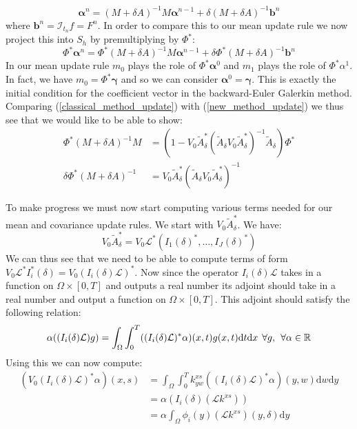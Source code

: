 \documentclass{article}
\theoremstyle{definition}
\theoremstyle{remark}
\theoremstyle{remark}
\begin{document}
\begin{equation}
    \boldsymbol{\alpha}^{n}=(M+\delta A)^{-1}M\boldsymbol{\alpha}^{n-1}+\delta(M+\delta A)^{-1}\mathbf{b}^{n}
\end{equation}
where $\mathbf{b}^{n}=\mathcal{I}_{t_n}f=F^{n}$. In order to compare this to our mean update rule we now project this into $S_{h}$ by premultiplying by $\Phi^{*}$:
\begin{equation}
    \label{classical_method_update}
    \Phi^{*}\boldsymbol{\alpha}^{n}=\Phi^{*}(M+\delta A)^{-1}M\boldsymbol{\alpha}^{n-1}+\delta\Phi^{*}(M+\delta A)^{-1}\mathbf{b}^{n}
\end{equation}
In our mean update rule $m_{0}$ plays the role of $\Phi^{*}\boldsymbol{\alpha}^{0}$ and $m_{1}$ plays the role of $\Phi^{*}\alpha^{1}$. In fact, we have $m_{0}=\Phi^{*}\boldsymbol{\gamma}$ and so we can consider $\boldsymbol{\alpha}^{0}=\boldsymbol{\gamma}$. This is exactly the initial condition for the coefficient vector in the backward-Euler Galerkin method. Comparing (\ref{classical_method_update}) with (\ref{new_method_update}) we thus see that we would like to be able to show:
\begin{align}
    \Phi^{*}(M+\delta A)^{-1}M &= \left(1-V_{0}\tilde{A}_{\delta}^{*}(\tilde{A}_{\delta}V_{0}\tilde{A}_{\delta}^{*})^{-1}\tilde{A}_{\delta}\right)\Phi^{*} \\
    \delta\Phi^{*}(M+\delta A)^{-1} &= V_{0}\tilde{A}_{\delta}^{*}(\tilde{A}_{\delta}V_{0}\tilde{A}_{\delta}^{*})^{-1}
\end{align}

To make progress we must now start computing various terms needed for our mean and covariance update rules. We start with $V_{0}\tilde{A}_{\delta}^{*}$. We have:
\begin{equation*}
    V_{0}\tilde{A}_{\delta}^{*}=V_{0}\mathcal{L}^{*}(I_{1}(\delta)^{*},\dots,I_{J}(\delta)^{*})
\end{equation*}
We can thus see that we need to be able to compute terms of form $V_{0}\mathcal{L}^{*}I_{i}^{*}(\delta)=V_{0}(I_{i}(\delta)\mathcal{L})^{*}$. Now since the operator $I_{i}(\delta)\mathcal{L}$ takes in a function on $\Omega\times[0,T]$ and outputs a real number its adjoint should take in a real number and output a function on $\Omega\times[0,T]$. This adjoint should satisfy the following relation:
\begin{equation}
    \alpha((I_{i}(\delta)\mathcal{L})g)=\int_{\Omega}\int_{0}^{T}((I_{i}(\delta)\mathcal{L})^{*}\alpha)(x,t)g(x,t)\mathrm{d}t\mathrm{d}x \hspace{0.15cm} \forall{g}, \hspace{0.15cm} \forall\alpha\in\mathbb{R}
\end{equation}
Using this we can now compute:
\begin{align*}
    (V_{0}(I_{i}(\delta)\mathcal{L})^{*}\alpha)(x,s) &= \int_{\Omega}\int_{0}^{T}k_{yw}^{xs}((I_{i}(\delta)\mathcal{L})^{*}\alpha)(y,w)\mathrm{d}w\mathrm{d}y \\
    &=\alpha (I_{i}(\delta)(\mathcal{L}k^{xs})) \\
    &=\alpha\int_{\Omega}\phi_{i}(y)(\mathcal{L}k^{xs})(y,\delta)\mathrm{d}y
\end{align*}
\end{document}

